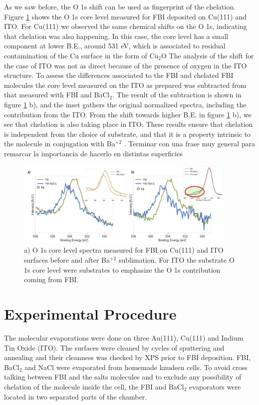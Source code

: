 \documentclass[aps,prl,reprint,longbibliography,superscriptaddress]{revtex4-1}
\def\BaCl{BaCl$_2$ }
\def\Ba{Ba$^{+2}$ }
\newcommand{\completar}[1]{{\color{red} #1}}
\begin{document}
As we saw before, the O 1s shift can be used as fingerprint of the chelation. Figure \ref{XPS_FBI_Cu_ITO} shows the O 1s core level measured for FBI deposited on Cu(111) and ITO. For Cu(111) we observed the same chemical shifts on the O 1s, indicating that chelation was also happening. In this case, the core level has a small component at lower B.E., around 531 eV, which is associated to residual contamination of the Cu surface in the form of Cu$_2$O \cite{zhu_surface_2013}
The analysis of the shift for the case of ITO was not as direct because of the presence of oxygen in the ITO structure. To assess the differences associated to the FBI and chelated FBI molecules the core level measured on the ITO as prepared  was subtracted from that measured with FBI and BaCl$_2$. The result of the subtraction is shown in figure \ref{XPS_FBI_Cu_ITO} b), and the inset gathers the original normalized spectra, including the contribution from the ITO. From the shift towards higher B.E. in figure \ref{XPS_FBI_Cu_ITO} b), we see that chelation is also taking place in ITO. These results ensure that chelation is independent from the choice of substrate, and that it is a property intrinsic to the molecule in conjugation with \Ba. 
\completar{Terminar con una frase muy general para remarcar la importancia de hacerlo en distintas superficies}  


\begin{figure}[ht!]
	\includegraphics[width=0.95\textwidth]{figures/fig5_cu_ito.png}
	\caption{\label{XPS_FBI_Cu_ITO} 
    a) O 1s core level spectra measured for FBI on Cu(111) and ITO surfaces before and after \Ba sublimation. For ITO the substrate O 1s core level were substrates to emphasize the O 1s contribution coming from FBI.}
\end{figure}  


\section{Experimental Procedure}

 The molecular evaporations were done on three Au(111), Cu(111) and Indium Tin Oxide (ITO). The surfaces were cleaned by cycles of sputtering and annealing and their cleanness was checked by XPS prior to FBI deposition. FBI, \BaCl and NaCl were evaporated from homemade knudsen cells. To avoid cross talking between FBI and the salts molecules and to exclude any possibility of chelation of the molecule inside the cell, the FBI and \BaCl  evaporators were located in two separated parts of the chamber.
 
\end{document}
